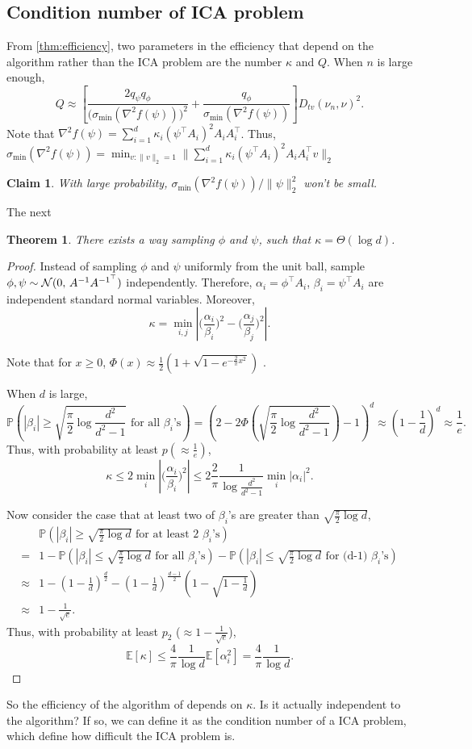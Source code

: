 \documentclass[english]{article} %
\newcommand{\cN}{\cal{N}}
\newcommand{\E}{\mathbb{E}}
\newcommand{\Prob}[1]{\mathbb{P}\left(#1\right)}
\newtheorem{thm}[lemma]{Theorem}
\newtheorem{claim}[lemma]{Claim}
\theoremstyle{definition}
\begin{document}
\subsection{Condition number of ICA problem}
From \cref{thm:efficiency}, two parameters in the efficiency that depend on the algorithm rather than the ICA problem are the number $\kappa$ and $Q$. 
When $n$ is large enough, 
\[
Q\approx \left[ \frac{2q_{\psi}q_{\phi}}{\big(\sigma_{\min}(\nabla^2f(\psi))\big)^2}+\frac{q_{\phi}}{\sigma_{\min}(\nabla^2f(\psi))}\right]D_{tv}(\nu_n , \nu)^2.
\] 
Note that $\nabla^2f(\psi) = \sum_{i=1}^{d} \kappa_i(\psi^{\top}A_i)^2A_iA_i^{\top}$. Thus, $\sigma_{\min}(\nabla^2f(\psi)) = \min_{v:\|v\|_2=1}\|\sum_{i=1}^{d} \kappa_i(\psi^{\top}A_i)^2A_iA_i^{\top}v\|_2$ 

\begin{claim}
With large probability, $\sigma_{\min}(\nabla^2f(\psi))/\|\psi\|_2^2$ won't be small.
\end{claim}

The next
\begin{thm}
There exists a way sampling $\phi$ and $\psi$, such that $\kappa = \Theta(\log d)$.
\end{thm}
\begin{proof}
Instead of sampling $\phi$ and $\psi$ uniformly from the unit ball, sample $\phi,\psi \sim {\cN} (0,\,A^{-1}A^{{-1}^{\top}})$ independently. Therefore, $\alpha_i = \phi^{\top}A_i$, $\beta_i = \psi^{\top}A_i$ are independent standard normal variables. Moreover, 
\[
\kappa  = \min_{i,j} \left\vert \big(\frac{\alpha_i}{\beta_i}\big)^2 - \big(\frac{\alpha_j}{\beta_j}\big)^2 \right\vert.
\] 

Note that for $x\ge0$, $\Phi(x) \approx \frac12 (1+\sqrt{1-e^{-\frac{2}{\pi}x^2}})$ \citep{aludaat2008note}.
 
 When $d$ is large,
\[
\Prob{|\beta_i| \ge \sqrt{\frac{\pi}{2}\log \frac{d^2}{d^2-1}} \text{ for all } \beta_i\text{'s}} = (2- 2\Phi(\sqrt{\frac{\pi}{2}\log \frac{d^2}{d^2-1}})-1)^d \approx \left(1-\frac{1}{d}\right)^d \approx \frac{1}{e}.
\]
Thus, with probability at least $p (\approx \frac{1}{e})$,
\[
\kappa \le 2 \min_i \left\vert \big(\frac{\alpha_i}{\beta_i}\big)^2\right\vert \le 2 \frac{2}{\pi}\frac{1}{\log \frac{d^2}{d^2-1}}\min_i |\alpha_i|^2.
\]

Now consider the case that at least two of $\beta_i$'s are greater than $\sqrt{\frac{\pi}{2}\log d}$,
\begin{align*}
& \Prob{|\beta_i| \ge \sqrt{\frac{\pi}{2}\log d} \text{ for at least 2 } \beta_i\text{'s}} \\
=  & 1 - \Prob{|\beta_i| \le \sqrt{\frac{\pi}{2}\log d} \text{ for all } \beta_i\text{'s}} - \Prob{|\beta_i| \le \sqrt{\frac{\pi}{2}\log d} \text{ for (d-1) } \beta_i\text{'s}} \\
\approx & 1 - (1-\frac{1}{d})^{\frac{d}{2}} -  (1-\frac{1}{d})^{\frac{d-1}{2}}(1-\sqrt{1-\frac{1}{d}}) \\
\approx & 1 -\frac{1}{\sqrt{e}}.
\end{align*}
Thus, with probability at least $p_2$ ($\approx 1-\frac{1}{\sqrt{e}}$),
\[
\E[\kappa] \le \frac{4}{\pi} \frac{1}{\log d} \E[\alpha_i^2] = \frac{4}{\pi} \frac{1}{\log d}.
\]
\end{proof}

So the efficiency of the algorithm of \citet{DHsu2012} depends on $\kappa$. Is it actually independent to the algorithm? If so, we can define it as the condition number of a ICA problem, which define how difficult the ICA problem is. 



\end{document}

